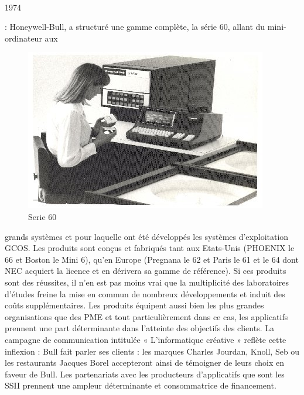 \documentclass[11pt]{article}
\begin{document}
		\paragraph{}
		\begin{bf}1974\end{bf}: Honeywell-Bull, a structuré une gamme complète, la série 60, allant du mini-ordinateur aux 
		\begin{figure}
		\includegraphics[scale=1]{serie_60.jpg}
		\caption{Serie 60}
		\end{figure} 
		grands systèmes et pour laquelle ont été développés les systèmes d’exploitation GCOS. Les produits sont conçus et 
		fabriqués tant aux Etats-Unis (PHOENIX le 66 et Boston le Mini 6), qu’en Europe (Pregnana le 62 et Paris le 61 et le 
		64 dont NEC acquiert la licence et en dérivera sa gamme de référence). Si ces produits sont des réussites, il n’en est 
		pas moins vrai que la multiplicité des laboratoires d’études freine la mise en commun de nombreux développements et 
		induit des coûts supplémentaires. Les produits équipent aussi bien les plus grandes organisations que des PME et tout 
		particulièrement dans ce cas, les applicatifs prennent une part déterminante dans l’atteinte des objectifs des clients.\newline{}
		La campagne de communication intitulée « L’informatique créative » reflète cette inflexion : Bull fait parler ses 
		clients : les marques Charles Jourdan, Knoll, Seb ou les restaurants Jacques Borel accepteront ainsi de témoigner de 
		leurs choix en faveur de Bull. Les partenariats avec les producteurs d’applicatifs que sont les SSII prennent une 
		ampleur déterminante et consommatrice de financement.
\end{document}
